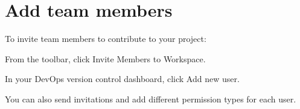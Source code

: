 \chapter{Add team members}
\hypertarget{md__library_2_package_cache_2com_8unity_8collab-proxy_0d2_83_81_2_documentation_0i_2_add_members}{}\label{md__library_2_package_cache_2com_8unity_8collab-proxy_0d2_83_81_2_documentation_0i_2_add_members}
\label{md__library_2_package_cache_2com_8unity_8collab-proxy_0d2_83_81_2_documentation_0i_2_add_members_autotoc_md128}%
%
 To invite team members to contribute to your project\+:


\begin{DoxyEnumerate}
\item From the toolbar, click Invite Members to Workspace.


\item In your Dev\+Ops version control dashboard, click Add new user.
\end{DoxyEnumerate}

You can also send invitations and add different permission types for each user. 